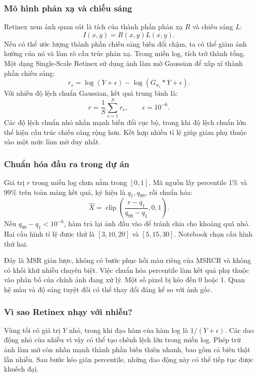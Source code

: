 \subsubsection{Mô hình phản xạ và chiếu sáng}
Retinex xem ảnh quan sát là tích của thành phần phản xạ $R$ và chiếu sáng $L$:
\begin{equation}
I(x,y)=R(x,y)L(x,y).
\end{equation}
Nếu có thể ước lượng thành phần chiếu sáng biến đổi chậm, ta có thể giảm ảnh hưởng của nó và làm rõ cấu trúc phản xạ. Trong miền log, tích trở thành tổng. Một dạng Single-Scale Retinex sử dụng ảnh làm mờ Gaussian để xấp xỉ thành phần chiếu sáng:
\begin{equation}
r_s=\log(Y+\epsilon)-\log(G_{\sigma_s}*Y+\epsilon).
\end{equation}
Với nhiều độ lệch chuẩn Gaussian, kết quả trung bình là:
\begin{equation}
r=\frac{1}{S}\sum_{s=1}^{S}r_s,\qquad \epsilon=10^{-6}.
\label{eq:msr}
\end{equation}
Các độ lệch chuẩn nhỏ nhấn mạnh biến đổi cục bộ, trong khi độ lệch chuẩn lớn thể hiện cấu trúc chiếu sáng rộng hơn. Kết hợp nhiều tỉ lệ giúp giảm phụ thuộc vào một mức làm mờ duy nhất.

\subsubsection{Chuẩn hóa đầu ra trong dự án}
Giá trị $r$ trong miền log chưa nằm trong $[0,1]$. Mã nguồn lấy percentile 1\% và 99\% trên toàn mảng kết quả, ký hiệu là $q_1,q_{99}$, rồi chuẩn hóa:
\begin{equation}
\widehat{X}=\operatorname{clip}\!\left(\frac{r-q_1}{q_{99}-q_1},0,1\right).
\label{eq:retinexnorm}
\end{equation}
Nếu $q_{99}-q_1<10^{-6}$, hàm trả lại ảnh đầu vào để tránh chia cho khoảng quá nhỏ. Hai cấu hình tỉ lệ được thử là $[3,10,20]$ và $[5,15,30]$. Notebook chọn cấu hình thứ hai.

Đây là MSR giản lược, không có bước phục hồi màu riêng của MSRCR và không có khối khử nhiễu chuyên biệt. Việc chuẩn hóa percentile làm kết quả phụ thuộc vào phân bố của chính ảnh đang xử lý. Một số pixel bị kéo đến 0 hoặc 1. Quan hệ màu và độ sáng tuyệt đối có thể thay đổi đáng kể so với ảnh gốc.

\subsubsection{Vì sao Retinex nhạy với nhiễu?}
Vùng tối có giá trị $Y$ nhỏ, trong khi đạo hàm của hàm log là $1/(Y+\epsilon)$. Các dao động nhỏ của nhiễu vì vậy có thể tạo chênh lệch lớn trong miền log. Phép trừ ảnh làm mờ còn nhấn mạnh thành phần biến thiên nhanh, bao gồm cả biên thật lẫn nhiễu. Sau bước kéo giãn percentile, những dao động này có thể tiếp tục được khuếch đại.

